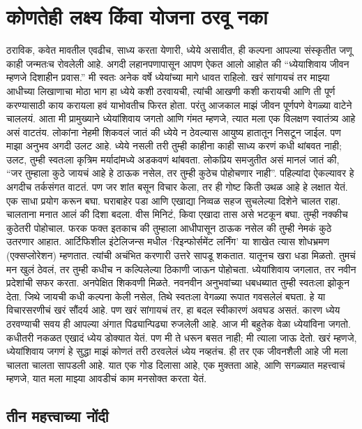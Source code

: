 \chapter{कोणतेही लक्ष्य किंवा योजना ठरवू नका}
ठराविक, कवेत मावतील एवढीच, साध्य करता येणारी, ध्येये असावीत, ही कल्पना आपल्या संस्कृतीत जणू काही जन्मतःच रोवलेली आहे. अगदी लहानपणापासून आपण ऐकत आलो आहोत की ``ध्येयाशिवाय जीवन म्हणजे दिशाहीन प्रवास.'' मी स्वतः अनेक वर्षे ध्येयांच्या मागे धावत राहिलो. खरं सांगायचं तर माझ्या आधीच्या लिखाणाचा मोठा भाग हा ध्येये कशी ठरवायची, त्यांची आखणी कशी करायची आणि ती पूर्ण करण्यासाठी काय करायला हवं याभोवतीच फिरत होता.
परंतु आजकाल माझं जीवन पूर्णपणे वेगळ्या वाटेने चाललयं. आता मी प्रामुख्याने ध्येयांशिवाय जगतो आणि गंमत म्हणजे, त्यात मला एक विलक्षण स्वातंत्र्य आहे असं वाटतंय. लोकांना नेहमी शिकवलं जातं की ध्येये न ठेवल्यास आयुष्य हातातून निसटून जाईल. पण माझा अनुभव अगदी उलट आहे. ध्येये नसली तरी तुम्ही काहीना काही साध्य करणं कधी थांबवत नाही; उलट, तुम्ही स्वतःला कृत्रिम मर्यादांमध्ये अडकवणं थांबवता.
लोकप्रिय समजुतीत असं मानलं जातं की,  ``जर तुम्हाला कुठे जायचं आहे हे ठाऊक नसेल, तर तुम्ही कुठेच पोहोचणार नाही''. पहिल्यांदा ऐकल्यावर हे अगदीच तर्कसंगत वाटतं. पण जर शांत बसून विचार केला, तर ही गोष्ट किती उथळ आहे हे लक्षात येतं. एक साधा प्रयोग करून बघा. घराबाहेर पडा आणि एखाद्या निव्वळ सहज सुचलेल्या दिशेने चालत राहा. चालताना मनात आलं की दिशा बदला. वीस मिनिटं, किवा एखादा तास असे भटकून बघा. तुम्ही नक्कीच कुठेतरी पोहोचाल. फरक फक्त इतकाच की तुम्हाला आधीपासून ठाऊक नसेल की तुम्ही नेमकं कुठे उतरणार आहात. आर्टिफिशील इंटेलिजन्स मधील `रिइन्फोर्समेंट लर्निंग' या शाखेत त्यास शोधभ्रमण (एक्सप्लोरेशन) म्हणतात. त्यांची अचंभित करणारी उत्तरे सापडू शकतात. 
यातूनच खरा धडा मिळतो. तुमचं मन खुलं ठेवलं, तर तुम्ही कधीच न कल्पिलेल्या ठिकाणी जाऊन पोहोचता. ध्येयांशिवाय जगलात, तर नवीन प्रदेशांची सफर करता. अनपेक्षित शिकवणी मिळते. नवनवीन अनुभवांच्या धबधब्यात तुम्ही स्वतःला झोकून देता. जिथे जायची कधी कल्पना केली नसेल, तिथे स्वतःला वेगळ्या रूपात गवसलेलं बघता. हे या विचारसरणीचं खरं सौंदर्य आहे. पण खरं सांगायचं तर, हा बदल स्वीकारणं अवघड असतं. कारण ध्येय ठरवण्याची सवय ही आपल्या अंगात पिढ्यान्पिढ्या रुजलेली आहे.
आज मी बहुतेक वेळा ध्येयांविना जगतो. कधीतरी नकळत एखादं ध्येय डोक्यात येतं. पण मी ते धरून बसत नाही; मी त्याला जाऊ देतो. खरं म्हणजे, ध्येयांशिवाय जगणं हे सुद्धा माझं कोणतं तरी ठरवलेलं ध्येय नव्हतंच. ही तर एक जीवनशैली आहे जी मला चालता चालता सापडली आहे. यात एक गोड दिलासा आहे, एक मुक्तता आहे, आणि सगळ्यात महत्त्वाचं म्हणजे,  यात मला माझ्या आवडीचं काम मनसोक्त करता येतं.

\section*{तीन महत्त्वाच्या नोंदी}

